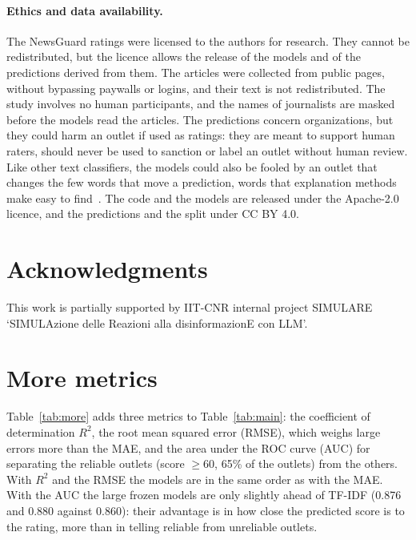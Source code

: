 \documentclass[11pt,a4paper]{article}
\begin{document}
\paragraph{Ethics and data availability.}
The NewsGuard ratings were licensed to the authors for research. They cannot be redistributed, but the licence allows
the release of the models and of the predictions derived from them. The articles were collected from public pages,
without bypassing paywalls or logins, and their text is not redistributed. The study involves no human participants,
and the names of journalists are masked before the models read the articles. The predictions concern organizations, but
they could harm an outlet if used as ratings: they are meant to support human raters, should never be used to sanction
or label an outlet without human review. Like other text
classifiers, the models could also be fooled by an outlet that changes the few words that move a prediction, words that
explanation methods make easy to find~\cite{kozik2024explainability}. The code and the models are released under the
Apache-2.0 licence, and the predictions and the split under CC BY 4.0.

\section*{Acknowledgments}
This work is partially supported by IIT-CNR internal project SIMULARE `SIMULAzione delle Reazioni alla
disinformazionE con LLM'.

\appendix

\section{More metrics}\label{app:measures}
Table~\ref{tab:more} adds three metrics to Table~\ref{tab:main}: the coefficient of determination $R^2$, the root mean
squared error (RMSE), which weighs large errors more than the MAE, and the area under the ROC curve (AUC) for separating
the reliable outlets (score $\geq 60$, 65\% of the outlets) from the others. With $R^2$ and the RMSE the models are in
the same order as with the MAE. With the AUC the large frozen models are only slightly ahead of TF-IDF (0.876 and 0.880
against 0.860): their advantage is in how close the predicted score is to the rating, more than in telling reliable from
unreliable outlets.
\end{document}
